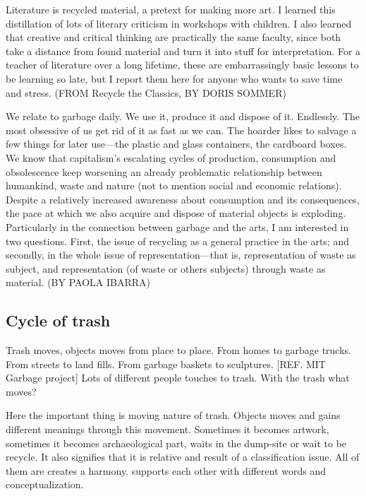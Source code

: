 Literature is recycled material, a pretext for making more art. I learned this distillation of lots of literary criticism in workshops with children. I also learned that creative and critical thinking are practically the same faculty, since both take a distance from found material and turn it into stuff for interpretation. For a teacher of literature over a long lifetime, these are embarrassingly basic lessons to be learning so late, but I report them here for anyone who wants to save time and stress. (FROM Recycle the Classics, BY DORIS SOMMER)

We relate to garbage daily. We use it, produce it and dispose of it. Endlessly. The most obsessive of us get rid of it as fast as we can. The hoarder likes to salvage a few things for later use---the plastic and glass containers, the cardboard boxes. We know that capitalism’s escalating cycles of production, consumption and obsolescence keep worsening an already problematic relationship between humankind, waste and nature (not to mention social and economic relations). Despite a relatively increased awareness about consumption and its consequences, the pace at which we also acquire and dispose of material objects is exploding. Particularly in the connection between garbage and the arts, I am interested in two questions. First, the issue of recycling as a general practice in the arts; and secondly, in the whole issue of representation---that is, representation of waste as subject, and representation (of waste or others subjects) through waste as material. (BY PAOLA IBARRA)

\subsection{Cycle of trash}
Trash moves, objects moves from place to place. From homes to garbage trucks. From streets to land fills. From garbage baskets to sculptures. [REF. MIT Garbage project] Lots of different people touches to trash. With the trash what moves?

Here the important thing is moving nature of trash. Objects moves and gains different meanings through this movement. Sometimes it becomes artwork, sometimes it becomes archaeological part, waits in the dump-site or wait to be recycle. It also signifies that it is relative and result of a classification issue. All of them are creates a harmony. supports each other with different words and conceptualization. 

